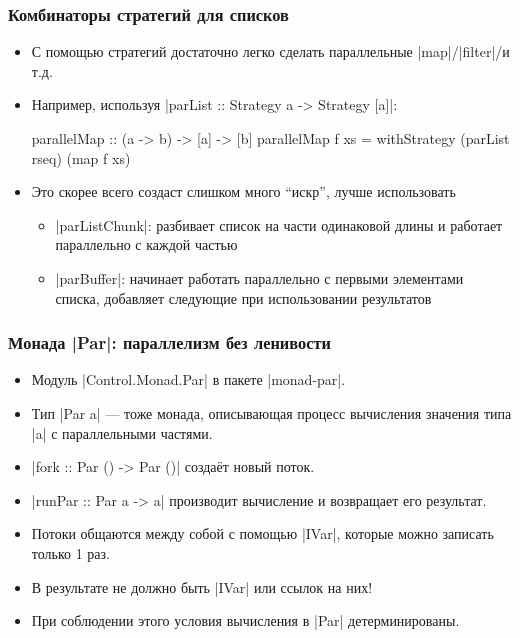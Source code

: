 \documentclass[11pt]{beamer}
\begin{document}
\begin{frame}[fragile]
  \frametitle{Комбинаторы стратегий для списков}
  \begin{itemize}
    \item С помощью стратегий достаточно легко сделать параллельные \haskinline|map|/\haskinline|filter|/и т.д.
    \item Например, используя \haskinline|parList :: Strategy a -> Strategy [a]|:
          \begin{haskell}
            parallelMap :: (a -> b) -> [a] -> [b]
            parallelMap f xs = 
              withStrategy (parList rseq) (map f xs)
          \end{haskell}
          \pause
    \item Это скорее всего создаст слишком много \enquote{искр}, лучше использовать
          \begin{itemize}
            \item \haskinline|parListChunk|: разбивает список на части одинаковой длины и работает параллельно с каждой частью
            \item \haskinline|parBuffer|: начинает работать параллельно с первыми элементами списка, добавляет следующие при использовании результатов
          \end{itemize}
  \end{itemize}
\end{frame}

\begin{frame}[fragile]
  \frametitle{Монада \haskinline|Par|: параллелизм без ленивости}
  \begin{itemize}
    \item Модуль \haskinline|Control.Monad.Par| в пакете \haskinline|monad-par|.
    \item Тип \haskinline|Par a| --- тоже монада, описывающая процесс вычисления значения типа \haskinline|a| с параллельными частями.
    \item \haskinline|fork :: Par () -> Par ()| создаёт новый поток.
    \item \haskinline|runPar :: Par a -> a| производит вычисление и возвращает его результат. \pause
    \item Потоки общаются между собой с помощью \haskinline|IVar|, которые можно записать только 1 раз.
    \item В результате не должно быть \haskinline|IVar| или ссылок на них!
    \item При соблюдении этого условия вычисления в \haskinline|Par| детерминированы.
  \end{itemize}
\end{frame}
\end{document}
